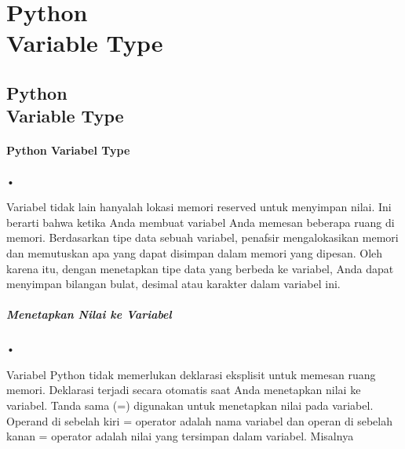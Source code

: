 \documentclass{wileySix}
\begin{document}
\subtitle{This is the Subtitle}


\part[Python Variable Type]
{Python\\ Variable Type}


\chapter[Python Variable Type]
{Python\\ Variable Type}



\subsection{Python Variabel Type}
\begin{flushleft}
•
\end{flushleft}Variabel tidak lain hanyalah lokasi memori reserved untuk menyimpan nilai. Ini berarti bahwa ketika Anda membuat variabel Anda memesan beberapa ruang di memori.
Berdasarkan tipe data sebuah variabel, penafsir mengalokasikan memori dan memutuskan apa yang dapat disimpan dalam memori yang dipesan. Oleh karena itu, dengan menetapkan tipe data yang berbeda ke variabel, Anda dapat menyimpan bilangan bulat, desimal atau karakter dalam variabel ini.



\subsubsection{Menetapkan Nilai ke Variabel}
\begin{flushleft}
•
\end{flushleft}Variabel Python tidak memerlukan deklarasi eksplisit untuk memesan ruang memori. Deklarasi terjadi secara otomatis saat Anda menetapkan nilai ke variabel. Tanda sama (=) digunakan untuk menetapkan nilai pada variabel.
Operand di sebelah kiri = operator adalah nama variabel dan operan di sebelah kanan = operator adalah nilai yang tersimpan dalam variabel. Misalnya 
\end{document}
